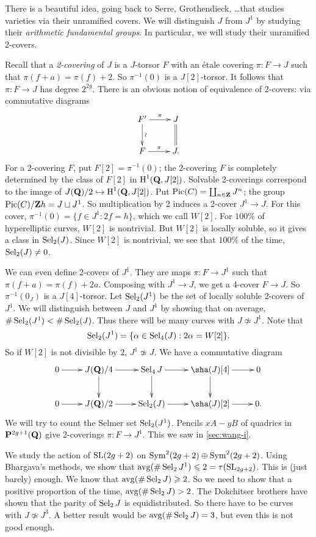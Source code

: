 There is a beautiful idea, going back to Serre, Grothendieck, \ldots that 
studies varieties via their unramified covers. We will distinguish $J$ from 
$J^1$ by studying their \emph{arithmetic fundamental groups}. In particular, 
we will study their unramified 2-covers. 

Recall that a \emph{2-covering} of $J$ is a $J$-torsor $F$ with an \'etale 
covering $\pi:F\to J$ such that $\pi(f+a) = \pi(f)+2 $. So $\pi^{-1}(0)$ is a 
$J[2]$-torsor. It follows that $\pi:F\to J$ has degree $2^{2 g}$. There is an 
obvious notion of equivalence of 2-covers: via commutative diagrams 
\[\xymatrix{
  F' \ar[r]^-\pi \ar[d]^-\wr 
    & J \ar@{=}[d] \\
  F \ar[r]^-\pi 
    & J .
}\]
For a 2-covering $F$, put $F[2]=\pi^{-1}(0)$; the 2-covering $F$ is completely 
determined by the class of $F[2]$ in $\operatorname{H}^1(\mathbf{Q},J[2])$. Solvable 2-coverings 
correspond to the image of $J(\mathbf{Q})/2\hookrightarrow \operatorname{H}^1(\mathbf{Q},J[2])$. Put 
$\operatorname{Pic}(C)=\coprod_{n\in \mathbf{Z}} J^n$; the group 
$\operatorname{Pic}(C)/\mathbf{Z} h=J\sqcup J^1$. So multiplication by 2 induces a 2-cover 
$J^1\to J$. For this cover, $\pi^{-1}(0)=\{f\in J^1:2 f=h\}$, which we call 
$W[2]$. For $100\%$ of hyperelliptic curves, $W[2]$ is nontrivial. But 
$W[2]$ is locally soluble, so it gives a class in $\operatorname{Sel}_2(J)$. Since 
$W[2]$ is nontrivial, we see that $100\%$ of the time, 
$\operatorname{Sel}_2(J)\ne 0$. 

We can even define 2-covers of $J^1$. They are maps $\pi:F\to J^1$ such that 
$\pi(f+a)=\pi(f)+2 a$. Composing with $J^1\to J$, we get a 4-cover 
$F\to J$. So $\pi^{-1}(0_J)$ is a $J[4]$-torsor. Let $\operatorname{Sel}_2(J^1)$ be the 
set of locally soluble 2-covers of $J^1$. We will distinguish between 
$J$ and $J^1$ by showing that on average, 
$\#\operatorname{Sel}_2(J^1) < \# \operatorname{Sel}_2(J)$. Thus there will be many curves with 
$J\not\simeq J^1$. Note that 
\[
  \operatorname{Sel}_2(J^1) = \{\alpha\in \operatorname{Sel}_4(J):2\alpha = W[2]\} .
\]
So if $W[2]$ is not divisible by $2$, $J^1\not\simeq J$. We have a commutative 
diagram 
\[\xymatrix{
  0 \ar[r] 
    & J(\dQ)/4 \ar[r] \ar[d] 
    & \selmer_4 J \ar[r] \ar[d] 
    & \sha(J)[4] \ar[r] \ar[d] 
    & 0 \\
  0 \ar[r] 
    & J(\dQ)/2 \ar[r] 
    & \selmer_2(J) \ar[r] 
    & \sha(J)[2] \ar[r] 
    & 0 .
}\]
We will try to count the Selmer set $\operatorname{Sel}_2(J^1)$. Pencils 
$x A-y B$ of quadrics in $\mathbf{P}^{2g+1}(\mathbf{Q})$ give 2-coverings 
$\pi:F\to J^1$. This we saw in \autoref{sec:wang-i}. 

We study the action of $\operatorname{SL}(2 g+2)$ on 
$\operatorname{Sym}^2(2 g+2)\oplus \operatorname{Sym}^2(2g+2)$. Using Bhargava's methods, we 
show that $\operatorname{avg}(\#\operatorname{Sel}_2 J^1) \leqslant 2=\tau(\operatorname{SL}_{2g+2})$. 
This is (just barely) enough. We know that 
$\operatorname{avg}(\#\operatorname{Sel}_2 J) \geqslant 2$. So we need to show that a positive 
proportion of the time, $\operatorname{avg}(\#\operatorname{Sel}_2 J)>2$. The Dokchitser brothers 
have shown that the parity of $\operatorname{Sel}_2 J$ is equidistributed. So there have 
to be curves with $J\not\simeq J^3$. A better result would be 
$\operatorname{avg}(\#\operatorname{Sel}_2 J)=3$, but even this is not good enough. 

